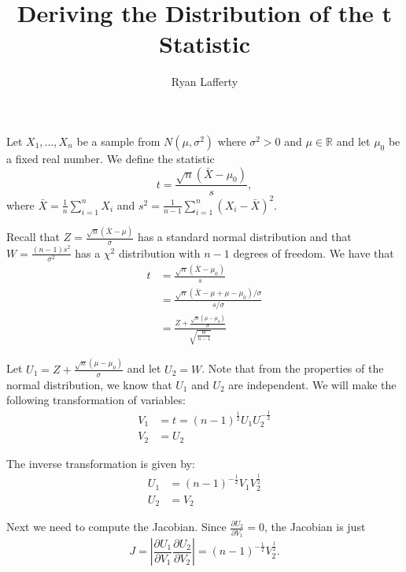 \documentclass[11pt]{article} %
\title{Deriving the Distribution of the t Statistic}
\author{Ryan Lafferty}
\begin{document}
\maketitle

Let $X_1, ..., X_n$ be a sample from $N(\mu, \sigma^2)$ where $\sigma^2>0$ and $\mu\in\mathbb{R}$ and let $\mu_0$ be a fixed real number. We define the statistic $$t = \frac{\sqrt{n}(\bar{X} - \mu_0)}{s},$$ where $\bar{X} = \frac{1}{n}\sum_{i=1}^n X_i$ and $s^2 = \frac{1}{n-1} \sum_{i=1}^n (X_i - \bar{X})^2$. 

Recall that $Z = \frac{\sqrt{n}(\bar{X}-\mu)}{\sigma}$ has a standard normal distribution and that $W = \frac{(n-1)s^2}{\sigma^2}$ has a $\chi^2$ distribution with $n-1$ degrees of freedom. We have that 
\begin{align*}
t &= \frac{\sqrt{n}(\bar{X} - \mu_0)}{s}\\
& = \frac{\sqrt{n}(\bar{X} - \mu + \mu - \mu_0)/\sigma}{s/\sigma}\\
 & = \frac{Z + \frac{\sqrt{n}(\mu-\mu_0)}{\sigma}}{\sqrt{\frac{W}{n-1}}}
\end{align*}

Let $U_1 = Z + \frac{\sqrt{n}(\mu-\mu_0)}{\sigma}$ and let $U_2 = W$. Note that from the properties of the normal distribution, we know that $U_1$ and $U_2$ are independent. We will make the following transformation of variables: 
\begin{align*}
V_1 & = t =  (n-1)^{\frac{1}2} U_1 U_2^{-\frac{1}2}\\
V_2 & = U_2
\end{align*} 

The inverse transformation is given by:
\begin{align*}
U_1 &= (n-1)^{-\frac{1}2}V_1 V_2^{\frac{1}2} \\
U_2 &= V_2
\end{align*}

Next we need to compute the Jacobian. Since $\frac{\partial U_2}{\partial V_1} = 0$, the Jacobian is just 
$$J = \left|\frac{\partial U_1}{\partial V_1}\frac{\partial U_2}{\partial V_2 }\right| = (n-1)^{-\frac{1}2} V_2^{\frac{1}2}.$$
\end{document}
